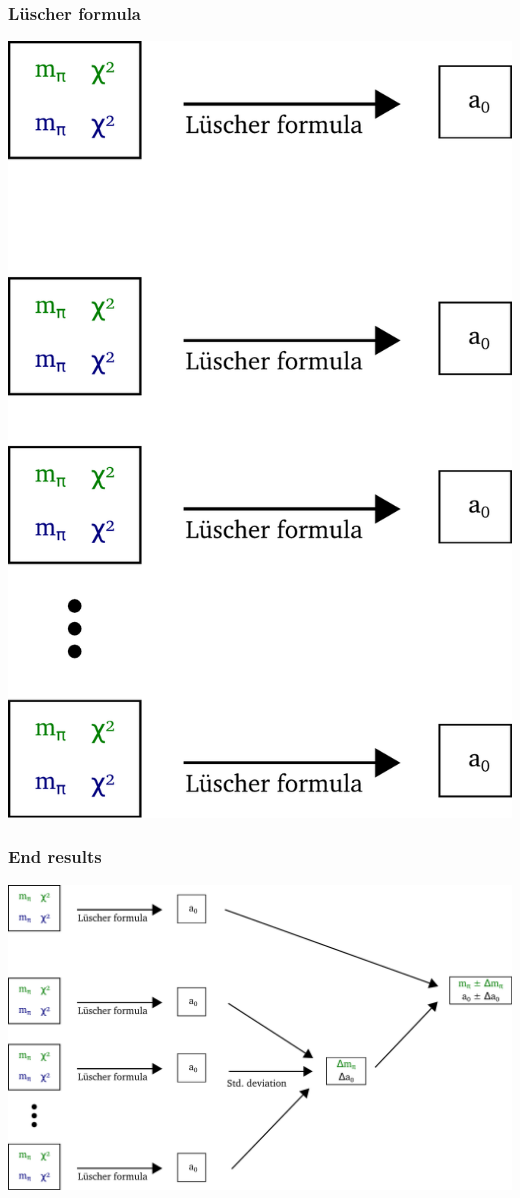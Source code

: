 \documentclass[english, fleqn]{beamer}
\begin{document}
\begin{frame}
    \frametitle{Lüscher formula}
    \includegraphics[scale=\scale]{sketches/07-luescher.pdf}
\end{frame}

\begin{frame}
    \frametitle{End results}
    \includegraphics[scale=\scale]{sketches/08-end-result.pdf}
\end{frame}
\end{document}
